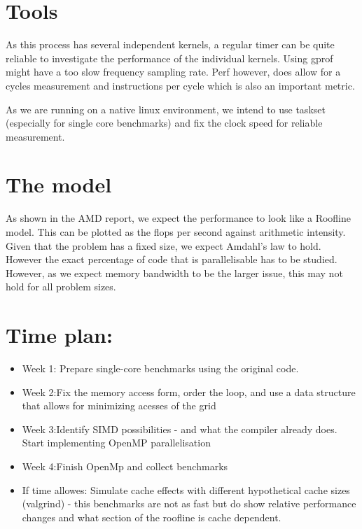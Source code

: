 \documentclass{article}
\begin{document}
\section{Tools}
As this process has several independent kernels, a regular timer can be quite reliable to investigate the performance of the individual kernels. Using gprof might have a too slow frequency sampling rate. 
Perf however, does allow for a cycles measurement and instructions per cycle which is also an important metric. 

As we are running on a native linux environment, we intend to use taskset (especially for single core benchmarks) and fix the clock speed for reliable measurement.

\section{The model}
As shown in the AMD report, we expect the performance to look like a Roofline model. This can be plotted as the flops per second against arithmetic intensity.
Given that the problem has a fixed size, we expect Amdahl's law to hold. However the exact percentage of code that is parallelisable has to be studied. However, as we expect memory bandwidth to be the larger issue, this may not hold for all problem sizes.

\section{Time plan:}
\begin{itemize}
    \item Week 1: Prepare single-core benchmarks using the original code. 
    \item Week 2:Fix the memory access form, order the loop, and use a data structure that allows for minimizing acesses of the grid
    \item Week 3:Identify SIMD possibilities - and what the compiler already does. Start implementing OpenMP parallelisation
    \item Week 4:Finish OpenMp and collect benchmarks
    \item If time allowes: Simulate cache effects with different hypothetical cache sizes (valgrind) - this benchmarks are not as fast but do show relative performance changes and what section of the roofline is cache dependent. 
\end{itemize}
\end{document}
